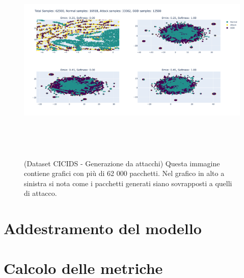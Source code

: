 \begin{figure}[htpb]
    \centering
    \includegraphics[width=\textwidth,height=10cm,keepaspectratio=true]{img/gen_test/cicids/CICIDS18_attack_only_12k.png}
    \caption{
      (Dataset CICIDS - Generazione da attacchi) Questa immagine contiene grafici con più di 62 000 pacchetti. Nel grafico in alto a sinistra si nota come i pacchetti generati siano sovrapposti a quelli di attacco.
    }
    \label{fig:gen_CICIDS_attack_1}
\end{figure}


\section{Addestramento del modello}

\section{Calcolo delle metriche}


